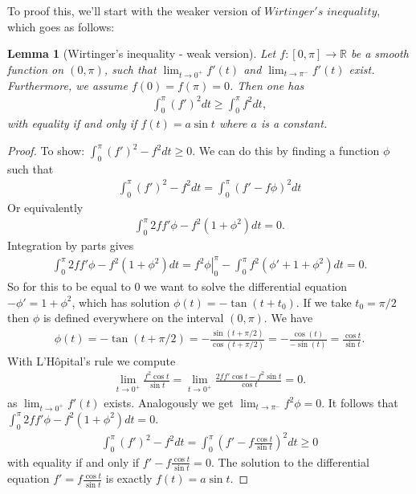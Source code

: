 \documentclass[12pt, a4paper, titlepage]{article}
\newtheorem{lemma}{Lemma}
\begin{document}
To proof this, we'll start with the weaker version of $Wirtinger's$ $inequality$, which goes as follows:

\begin{lemma}[Wirtinger's inequality - weak version] Let $ f: [0,\pi] \rightarrow \mathbb{R} $ be a smooth function on $(0,\pi)$, such that $\lim_{t\rightarrow 0^+}f'(t)$ and $\lim_{t\rightarrow \pi ^-}f'(t)$ exist. Furthermore, we assume $f(0) = f(\pi) = 0$. Then one has
\begin{align*}
\int_{0}^{\pi}(f')^2dt \geq \int_{0}^{\pi}f^2dt,
\end{align*}
with equality if and only if $f(t) = a\sin t$ where $a$ is a constant.
\end{lemma}

\begin{proof}
To show: $\int_{0}^{\pi}(f')^2-f^2dt \geq 0$.
We can do this by finding a function $\phi$ such that
\begin{align*}
\int_{0}^{\pi}(f')^2-f^2dt = \int_{0}^{\pi}(f'-f\phi)^2dt
\end{align*}
Or equivalently
\begin{align*}
\int_{0}^{\pi}2ff'\phi - f^2(1+\phi^2)dt = 0.
\end{align*}
Integration by parts gives
\begin{align*}
\int_{0}^{\pi}2ff'\phi - f^2(1+\phi^2)dt =  \left.f^2\phi\right|^{\pi}_0 - \int_{0}^{\pi}f^2(\phi'+1+\phi^2)dt = 0.
\end{align*}
So for this to be equal to $0$ we want to solve the differential equation $-\phi' = 1 + \phi^2$, which has solution $\phi(t) = -\tan(t + t_0)$. If we take $t_0 = \pi/2$ then $\phi$ is defined everywhere on the interval $(0,\pi)$. We have 
\begin{align*}
\phi(t) = -\tan(t + \pi/2) = -\frac{\sin(t+\pi/2)}{\cos(t+\pi/2)} = -\frac{\cos(t)}{-\sin(t)} = \frac{\cos t}{\sin t}.
\end{align*}
With L'H\^opital's rule we compute
\begin{align*}
\lim_{t\rightarrow 0^+}\frac{f^2\cos t}{\sin t} = \lim_{t\rightarrow 0^+}\frac{2ff'\cos t - f^2 \sin t}{\cos t} = 0.
\end{align*}
as $\lim_{t\rightarrow 0^+}f'(t)$ exists. Analogously we get $\lim_{t\rightarrow \pi ^-}f^2\phi = 0$. It follows that $\int_{0}^{\pi}2ff'\phi - f^2(1+\phi^2)dt = 0$.
\begin{align*}
\int_{0}^{\pi}(f')^2-f^2dt = \int_{0}^{\pi}\left(f'-f\frac{\cos t}{\sin t}\right)^2 dt \geq 0
\end{align*}
with equality if and only if $f'-f\frac{\cos t}{\sin t} = 0$. The solution to the differential equation $f' = f\frac{\cos t}{\sin t}$ is exactly $f(t) = a\sin t$.
\end{proof}
\end{document}
